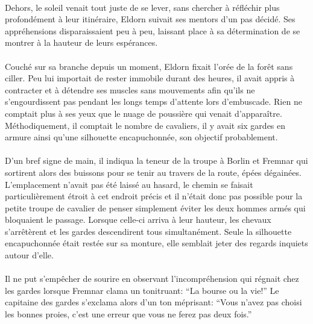 \paragraph{}
Dehors, le soleil venait tout juste de se lever, sans chercher à réfléchir
plus profondément à leur itinéraire, Eldorn suivait ses mentors d'un pas
décidé. Ses appréhensions disparaissaient peu à peu, laissant place à sa
détermination de se montrer à la hauteur de leurs espérances.

\contextswitch

\paragraph{}
Couché sur sa branche depuis un moment, Eldorn fixait l'orée de la forêt sans
ciller. Peu lui importait de rester immobile durant des heures, il avait
appris à contracter et à détendre ses muscles sans mouvements afin qu'ils ne
s'engourdissent pas pendant les longs temps d'attente lors d'embuscade. Rien
ne comptait plus à ses yeux que le nuage de poussière qui venait d'apparaître.
Méthodiquement, il comptait le nombre de cavaliers, il y avait six gardes en
armure ainsi qu'une silhouette encapuchonnée, son objectif probablement.

\paragraph{}
D'un bref signe de main, il indiqua la teneur de la troupe à Borlin et Fremnar
qui sortirent alors des buissons pour se tenir au travers de la route, épées
dégainées. L'emplacement n'avait pas été laissé au hasard, le chemin se
faisait particulièrement étroit à cet endroit précis et il n'était donc pas
possible pour la petite troupe de cavalier de penser simplement éviter les
deux hommes armés qui bloquaient le passage. Lorsque celle-ci arriva à leur
hauteur, les chevaux s'arrêtèrent et les gardes descendirent tous
simultanément. Seule la silhouette encapuchonnée était restée sur sa monture,
elle semblait jeter des regards inquiets autour d'elle.

\paragraph{}
Il ne put s'empêcher de sourire en observant l'incompréhension qui régnait
chez les gardes lorsque Fremnar clama un tonitruant: ``La bourse ou la vie!''
Le capitaine des gardes s'exclama alors d'un ton méprisant: ``Vous n'avez pas
choisi les bonnes proies, c'est une erreur que vous ne ferez pas deux fois.''

